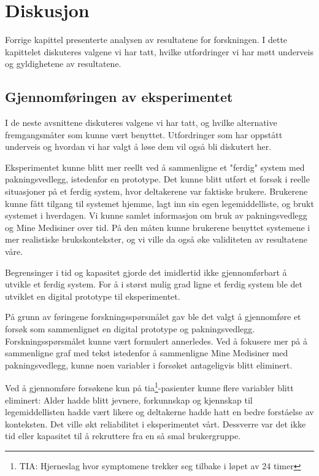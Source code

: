 \chapter{Diskusjon} \label{chap:diskusjon}
Forrige kapittel presenterte analysen av resultatene for forskningen. I dette kapittelet diskuteres valgene vi har tatt, hvilke utfordringer vi har møtt underveis og gyldighetene av resultatene. 


\section{Gjennomføringen av eksperimentet}
I de neste avsnittene diskuteres valgene vi har tatt, og hvilke alternative fremgangsmåter som kunne vært benyttet. Utfordringer som har oppstått underveis og hvordan vi har valgt å løse dem vil også bli diskutert her. 

Eksperimentet kunne blitt mer reellt ved å sammenligne et "ferdig" system med pakningsvedlegg, istedenfor en prototype. Det kunne blitt utført et forsøk i reelle situasjoner på et ferdig system, hvor deltakerene var faktiske brukere. Brukerene kunne fått tilgang til systemet hjemme, lagt inn sin egen legemiddelliste, og brukt systemet i hverdagen. Vi kunne samlet informasjon om bruk av pakningsvedlegg og Mine Medisiner over tid. På den måten kunne brukerene benyttet systemene i mer realistiske brukskontekster, og vi ville da også øke validiteten av resultatene våre.  

Begrensinger i tid og kapasitet gjorde det imidlertid ikke gjennomførbart å utvikle et ferdig system. For å i størst mulig grad ligne et ferdig system ble det utviklet en digital prototype til eksperimentet. 

På grunn av føringene forskningsspørsmålet gav ble det valgt å gjennomføre et forsøk som sammenlignet en digital prototype og pakningsvedlegg. Forskningsspørsmålet kunne vært formulert annerledes. Ved å fokusere mer på å sammenligne graf med tekst istedenfor å sammenligne Mine Medisiner med pakningsvedlegg, kunne noen variabler i forsøket antageligvis blitt eliminert. 

Ved å gjennomføre forsøkene kun på \acrshort{tia}\footnote{TIA: Hjerneslag hvor symptomene trekker seg tilbake i løpet av 24 timer}-pasienter kunne flere variabler blitt eliminert: Alder hadde blitt jevnere, forkunnskap og kjennskap til legemiddellisten hadde vært likere og deltakerne hadde hatt en bedre forståelse av konteksten. Det ville økt reliabilitet i eksperimentet vårt. Dessverre var det ikke tid eller kapasitet til å rekruttere fra en så smal brukergruppe. 

